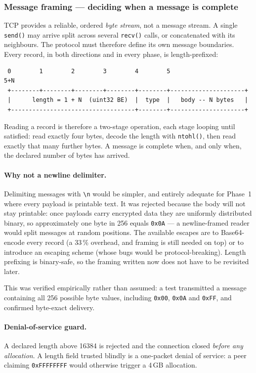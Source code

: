 \documentclass[11pt,a4paper]{article}
\begin{document}
\subsubsection{Message framing --- deciding when a message is complete}

TCP provides a reliable, ordered \emph{byte stream}, not a message stream. A single \texttt{send()}
may arrive split across several \texttt{recv()} calls, or concatenated with its neighbours. The
protocol must therefore define its own message boundaries. Every record, in both directions and in
every phase, is length-prefixed:

\begin{lstlisting}
 0        1        2        3        4        5                     5+N
 +--------+--------+--------+--------+--------+---------------------+
 |      length = 1 + N  (uint32 BE)  |  type  |   body -- N bytes   |
 +-----------------------------------+--------+---------------------+
\end{lstlisting}

Reading a record is therefore a two-stage operation, each stage looping until satisfied: read
exactly four bytes, decode the length with \texttt{ntohl()}, then read exactly that many further
bytes. A message is complete when, and only when, the declared number of bytes has arrived.

\paragraph{Why not a newline delimiter.} Delimiting messages with \texttt{\textbackslash n} would be
simpler, and entirely adequate for Phase~1 where every payload is printable text. It was rejected
because the body will not stay printable: once payloads carry encrypted data they are uniformly
distributed binary, so approximately one byte in 256 equals \texttt{0x0A} --- a newline-framed reader
would split messages at random positions. The available escapes are to Base64-encode every record (a 33\,\% overhead,
and framing is still needed on top) or to introduce an escaping scheme (whose bugs would be
protocol-breaking). Length prefixing is binary-safe, so the framing written now does not have to be
revisited later.

This was verified empirically rather than assumed: a test transmitted a message containing all 256
possible byte values, including \texttt{0x00}, \texttt{0x0A} and \texttt{0xFF}, and confirmed
byte-exact delivery.

\paragraph{Denial-of-service guard.} A declared length above 16384 is rejected and the connection
closed \emph{before any allocation}. A length field trusted blindly is a one-packet denial of
service: a peer claiming \texttt{0xFFFFFFFF} would otherwise trigger a 4\,GB allocation.
\end{document}
